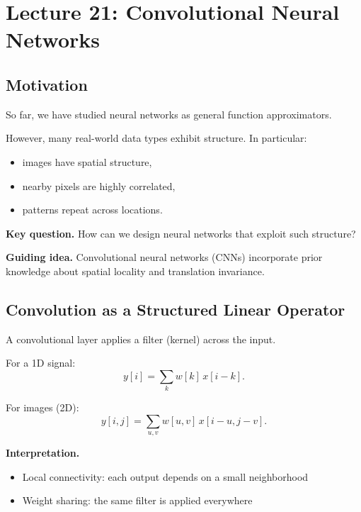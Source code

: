 \section{Lecture 21: Convolutional Neural Networks}

\subsection{Motivation}

So far, we have studied neural networks as general function approximators.

\medskip

\noindent
However, many real-world data types exhibit structure. In particular:

\begin{itemize}
    \item images have spatial structure,
    \item nearby pixels are highly correlated,
    \item patterns repeat across locations.
\end{itemize}

\medskip

\noindent
\textbf{Key question.}  
How can we design neural networks that exploit such structure?

\medskip

\noindent
\textbf{Guiding idea.}  
Convolutional neural networks (CNNs) incorporate prior knowledge about spatial locality and translation invariance.

\subsection{Convolution as a Structured Linear Operator}

A convolutional layer applies a filter (kernel) across the input.

\medskip

\noindent
For a 1D signal:
\[
y[i] = \sum_{k} w[k] \, x[i-k].
\]

\medskip

\noindent
For images (2D):
\[
y[i,j] = \sum_{u,v} w[u,v] \, x[i-u, j-v].
\]

\medskip

\noindent
\textbf{Interpretation.}

\begin{itemize}
    \item Local connectivity: each output depends on a small neighborhood
    \item Weight sharing: the same filter is applied everywhere
\end{itemize}

